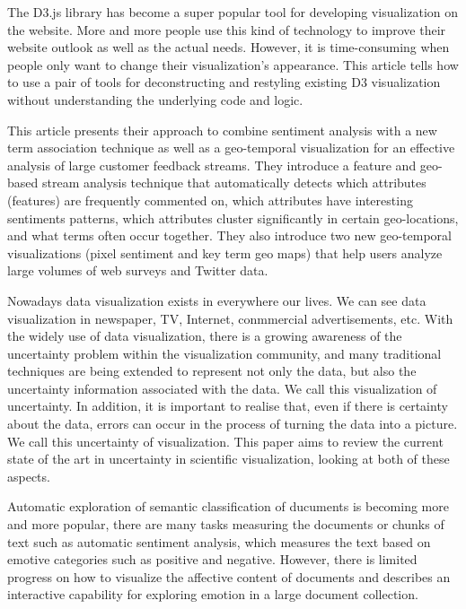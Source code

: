 The D3.js library has become a super popular tool for developing visualization on the website. More and more people use this kind of technology to improve their website outlook as well as the actual needs. However, it is time-consuming when people only want to change their visualization's appearance. This article tells how to use a pair of tools for deconstructing and restyling existing D3 visualization without understanding the underlying code and logic.\cite{harper2014deconstructing}

This article presents their approach to combine sentiment analysis with a new term association technique as well as a geo-temporal visualization for an effective analysis of large customer feedback streams. They introduce a feature and geo-based stream analysis technique that automatically detects which attributes (features) are frequently commented on, which attributes have interesting sentiments patterns, which attributes cluster significantly in certain geo-locations, and what terms often occur together. They also introduce two new geo-temporal visualizations (pixel sentiment and key term geo maps) that help users analyze large volumes of web surveys and Twitter data.\cite{hao2013visual}

Nowadays data visualization exists in everywhere our lives. We can see data visualization in newspaper, TV, Internet, conmmercial advertisements, etc. With the widely use of data visualization, there is a growing awareness of the uncertainty problem within the visualization community, and many traditional techniques are being extended to represent not only the data, but also the uncertainty information associated with the data. We call this visualization of uncertainty. In addition, it is important to realise that, even if there is certainty about the data, errors can occur in the process of turning the data into a picture. We call this uncertainty of visualization. This paper aims to review the current state of the art in uncertainty in scientific visualization, looking at both of these aspects.\cite{brodlie2012review}

Automatic exploration of semantic classification of ducuments is becoming more and more popular, there are many tasks measuring the documents or chunks of text such as automatic sentiment analysis, which measures the text based on emotive categories such as positive and negative. However, there is limited progress on how to visualize the affective content of documents and describes an interactive capability for exploring emotion in a large document collection.

